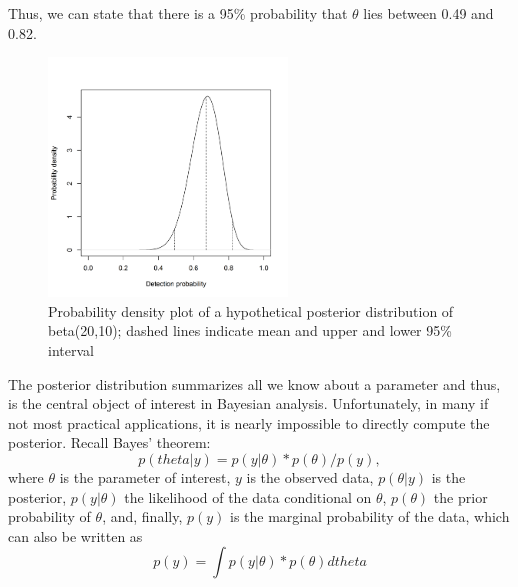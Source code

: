 Thus, we can state that there is a 95\% probability that $\theta$ lies
between 0.49 and 0.82.

\begin{figure}
\begin{center}
\includegraphics[height=2.5in]{figs/densityvsdetection}
\end{center}
\caption{Probability density plot of a hypothetical posterior distribution of beta(20,10); dashed lines indicate mean and upper and lower 95\% interval}
\label{densityvsdetection.fig}
\end{figure}

The posterior distribution summarizes all we know about a parameter
and thus, is the central object of interest in Bayesian
analysis. Unfortunately, in many if not most practical applications,
it is nearly impossible to directly compute the posterior. Recall
Bayes’ theorem:
\begin{equation}
p(theta|y) = p(y|\theta) * p(\theta) / p(y),
\label{mcmc.eq.bayes}
\end{equation}
where $\theta$ is the parameter of interest, $y$ is the observed data,
$p(\theta|y)$ is the posterior, $p(y|\theta)$ the likelihood of the
data conditional on $\theta$, $p(\theta)$ the prior probability of
$\theta$, and, finally, $p(y)$ is the marginal probability of the
data, which can also be written as
\[
p(y) = \int p(y|\theta) * p(\theta) dtheta
\]

